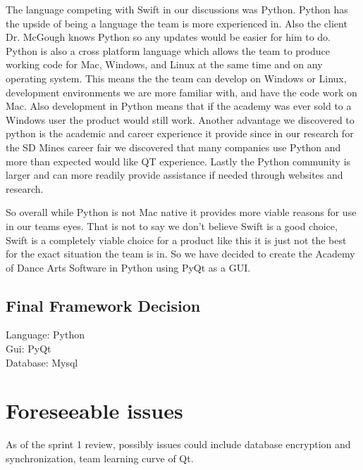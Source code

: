 \documentclass[11pt]{book}
\begin{document}
The language competing with Swift in our discussions was Python. Python has the upside of being a language the team is more experienced in. Also the client Dr. McGough knows Python so any updates would be easier for him to do. Python is also a cross platform language which allows the team to produce working code for Mac, Windows, and Linux at the same time and on any operating system. This means the the team can develop on Windows or Linux, development environments we are more familiar with, and have the code work on Mac. Also development in Python means that if the academy was ever sold to a Windows user the product would still work. Another advantage we discovered to python is the academic and career experience it provide since in our research for the SD Mines career fair we discovered that many companies use Python and more than expected would like QT experience. Lastly the Python community is larger and can more readily provide assistance if needed through websites and research.

So overall while Python is not Mac native it provides more viable reasons for use in our teams eyes. That is not to say we don't believe Swift is a good choice, Swift is a completely viable choice for a product like this it is just not the best for the exact situation the team is in. So we have decided to create the  Academy of Dance Arts Software in Python using PyQt as a GUI. 

\subsection{Final Framework Decision}
Language: Python\\
Gui: PyQt\\
Database: Mysql\\

\section{Foreseeable issues}
As of the sprint 1 review, possibly issues could include database encryption and synchronization, team learning curve of Qt.
\end{document}
